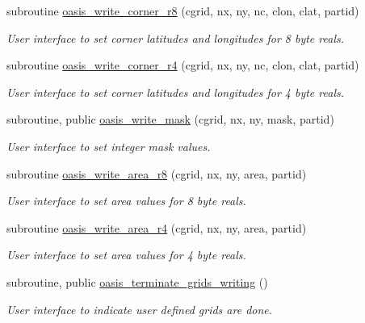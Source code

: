\begin{DoxyCompactItemize}
subroutine \hyperlink{namespacemod__oasis__grid_af6953999aa6fb1d0190187052bf52671}{oasis\+\_\+write\+\_\+corner\+\_\+r8} (cgrid, nx, ny, nc, clon, clat, partid)
\begin{DoxyCompactList}\small\item\em User interface to set corner latitudes and longitudes for 8 byte reals. \end{DoxyCompactList}\item 
subroutine \hyperlink{namespacemod__oasis__grid_a30e5d9c4766b2f323d4b930499e0f23b}{oasis\+\_\+write\+\_\+corner\+\_\+r4} (cgrid, nx, ny, nc, clon, clat, partid)
\begin{DoxyCompactList}\small\item\em User interface to set corner latitudes and longitudes for 4 byte reals. \end{DoxyCompactList}\item 
subroutine, public \hyperlink{namespacemod__oasis__grid_a16906db2b252a3a5ce85e21aa1336e3b}{oasis\+\_\+write\+\_\+mask} (cgrid, nx, ny, mask, partid)
\begin{DoxyCompactList}\small\item\em User interface to set integer mask values. \end{DoxyCompactList}\item 
subroutine \hyperlink{namespacemod__oasis__grid_ae54eaec7b4e9d4877af0ce8537b0b256}{oasis\+\_\+write\+\_\+area\+\_\+r8} (cgrid, nx, ny, area, partid)
\begin{DoxyCompactList}\small\item\em User interface to set area values for 8 byte reals. \end{DoxyCompactList}\item 
subroutine \hyperlink{namespacemod__oasis__grid_ad1d3e95cf63a2277b82167ec6c8148d4}{oasis\+\_\+write\+\_\+area\+\_\+r4} (cgrid, nx, ny, area, partid)
\begin{DoxyCompactList}\small\item\em User interface to set area values for 4 byte reals. \end{DoxyCompactList}\item 
subroutine, public \hyperlink{namespacemod__oasis__grid_a59755e271ccdd0c98807b5938ef33e78}{oasis\+\_\+terminate\+\_\+grids\+\_\+writing} ()
\begin{DoxyCompactList}\small\item\em User interface to indicate user defined grids are done. \end{DoxyCompactList}\item 

\end{DoxyCompactItemize}
